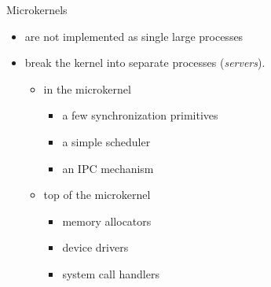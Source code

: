 \begin{frame}
  \begin{exampleblock}{Microkernels}
    \begin{itemize}
    \item are not implemented as single large processes
    \item break the kernel into separate processes (\emph{servers}).
      \begin{multicols}{2}
        \begin{itemize}
        \item in the microkernel
          \begin{itemize}
          \item a few synchronization primitives
          \item a simple scheduler
          \item an IPC mechanism
          \end{itemize}
        \item top of the microkernel
          \begin{itemize}
          \item memory allocators
          \item device drivers
          \item system call handlers
          \end{itemize}
        \end{itemize}
      \end{multicols}
    \end{itemize}
  \end{exampleblock}
\end{frame}


